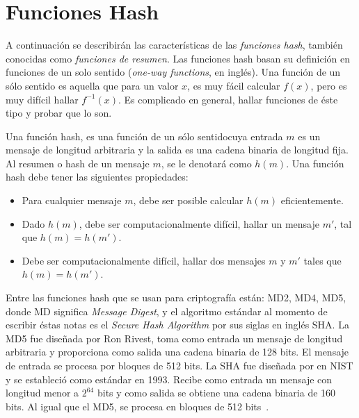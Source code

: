 \pagebreak
\section{Funciones Hash}
A continuaci\'on se describir\'an las caracter\'isticas de las {\it funciones
hash}, tambi\'en conocidas como {\it funciones de resumen}. Las funciones hash basan
su definici\'on en funciones de un solo sentido  ({\it one-way functions}, en ingl\'es).
Una funci\'on de un s\'olo sentido es aquella que para un valor $x$, es 
muy f\'acil calcular $f(x)$, pero es muy dif\'icil hallar $f^{-1}(x)$. Es 
complicado en general, hallar funciones de \'este tipo y probar que lo 
son.
\begin{definition}
Una funci\'on hash, es una funci\'on de un s\'olo sentidocuya entrada $m$
 es un mensaje de longitud arbitraria
y la salida es una cadena binaria de longitud fija. Al resumen o hash de 
un mensaje $m$, se le denotar\'a como $h(m)$. Una funci\'on hash debe
tener las siguientes propiedades:
\begin{itemize}
\item Para cualquier mensaje $m$, debe ser posible calcular $h(m)$ 
eficientemente. 
\item Dado $h(m)$, debe ser computacionalmente dif\'icil, hallar un mensaje
$m'$, tal que $h(m)=h(m')$.
\item Debe ser computacionalmente dif\'icil, hallar dos mensajes $m$ y $m'$ 
tales que $h(m)=h(m')$.
\end{itemize}
\end{definition}
 
Entre las funciones hash que se usan para criptograf\'ia est\'an: MD2, MD4,
MD5, donde MD significa {\it Message Digest}, y el algoritmo est\'andar al momento de escribir \'estas notas es el {\it Secure Hash Algorithm} por sus siglas
en ingl\'es SHA.
  La MD5 fue dise\~nada por Ron Rivest, toma como entrada un mensaje de 
longitud arbitraria y proporciona como salida una cadena binaria de 128 bits.
El mensaje de entrada se procesa por bloques de 512 bits. 
  La SHA fue dise\~nada por en NIST y se estableci\'o como est\'andar
en 1993. Recibe como entrada un mensaje con longitud menor a $2^{64}$ bits y
como salida se obtiene una cadena binaria de 160 bits. Al igual que el
MD5, se procesa en bloques de 512 bits~\cite{modes}.



